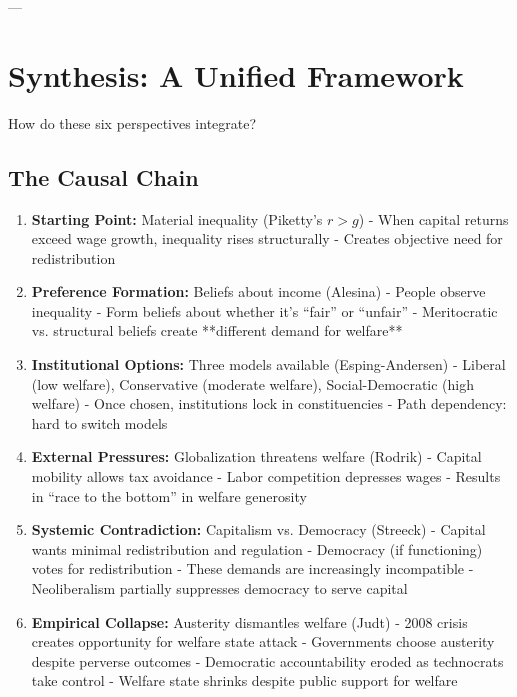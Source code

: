---

\clearpage


\section{Synthesis: A Unified Framework}
\label{sec:synthesis}

How do these six perspectives integrate?

\subsection{The Causal Chain}

\begin{enumerate}

\item \textbf{Starting Point:} Material inequality (Piketty's $r > g$)
   - When capital returns exceed wage growth, inequality rises structurally
   - Creates objective need for redistribution

\item \textbf{Preference Formation:} Beliefs about income (Alesina)
   - People observe inequality
   - Form beliefs about whether it's ``fair'' or ``unfair''
   - Meritocratic vs. structural beliefs create **different demand for welfare**

\item \textbf{Institutional Options:} Three models available (Esping-Andersen)
   - Liberal (low welfare), Conservative (moderate welfare), Social-Democratic (high welfare)
   - Once chosen, institutions lock in constituencies
   - Path dependency: hard to switch models

\item \textbf{External Pressures:} Globalization threatens welfare (Rodrik)
   - Capital mobility allows tax avoidance
   - Labor competition depresses wages
   - Results in ``race to the bottom'' in welfare generosity

\item \textbf{Systemic Contradiction:} Capitalism vs. Democracy (Streeck)
   - Capital wants minimal redistribution and regulation
   - Democracy (if functioning) votes for redistribution
   - These demands are increasingly incompatible
   - Neoliberalism partially suppresses democracy to serve capital

\item \textbf{Empirical Collapse:} Austerity dismantles welfare (Judt)
   - 2008 crisis creates opportunity for welfare state attack
   - Governments choose austerity despite perverse outcomes
   - Democratic accountability eroded as technocrats take control
   - Welfare state shrinks despite public support for welfare

\end{enumerate}

